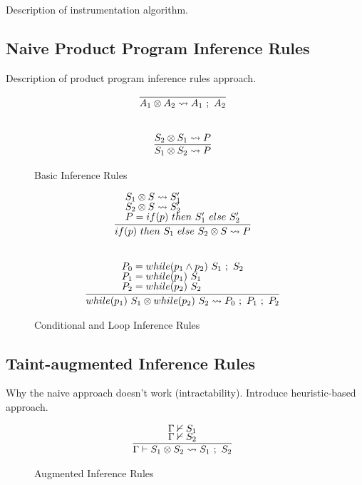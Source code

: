 \documentclass[letterpaper,twocolumn,10pt]{article}
\newcommand{\cross}{\otimes{}}
\begin{document}
Description of instrumentation algorithm.

\subsection{Naive Product Program Inference Rules}

Description of product program inference rules approach.

\begin{figure}
    \caption{Basic Inference Rules}
    \label{fig:infrules1}
    \[
		\begin{array}{c}
			\infer[]{A_1 \cross A_2 \leadsto A_1\ ;\ A_2}{} \\ \\ \\
			\infer[]{S_1 \cross S_2 \leadsto P}{
				S_2 \cross S_1 \leadsto P
			}
        \end{array}
    \]
\end{figure}

\begin{figure}
    \caption{Conditional and Loop Inference Rules}
    \label{fig:infrules2}
    \[
		\begin{array}{c}
			\infer[]{if(p)\ then\ S_1\ else\ S_2 \cross S \leadsto P}{
				\text{$S_1 \cross S \leadsto S_1'$} \\
				\text{$S_2 \cross S \leadsto S_2'$} \\
				\text{$P = if(p)\ then\ S_1'\ else\ S_2'$}
			} \\ \\ \\
			\infer[]{while(p_1)\ S_1 \cross while(p_2)\ S_2 \leadsto P_0\ ;\ P_1\ ;\ P_2}{
				\text{$P_0 = while(p_1 \land p_2)\ S_1\ ;\ S_2$} \\
				\text{$P_1 = while(p_1)\ S_1$} \\
				\text{$P_2 = while(p_2)\ S_2$}
			}
        \end{array}
    \]
\end{figure}

\subsection{Taint-augmented Inference Rules}

Why the naive approach doesn't work (intractability). Introduce heuristic-based approach.

\begin{figure}
    \caption{Augmented Inference Rules}
    \label{fig:auginfrules1}
    \[
		\begin{array}{c}
			\infer[]{\Gamma \vdash S_1 \cross S_2 \leadsto S_1\ ;\ S_2}{
				\Gamma \nvdash S_1 \\
				\Gamma \nvdash S_2
			} \\
		\end{array}
    \]
\end{figure}
\end{document}

